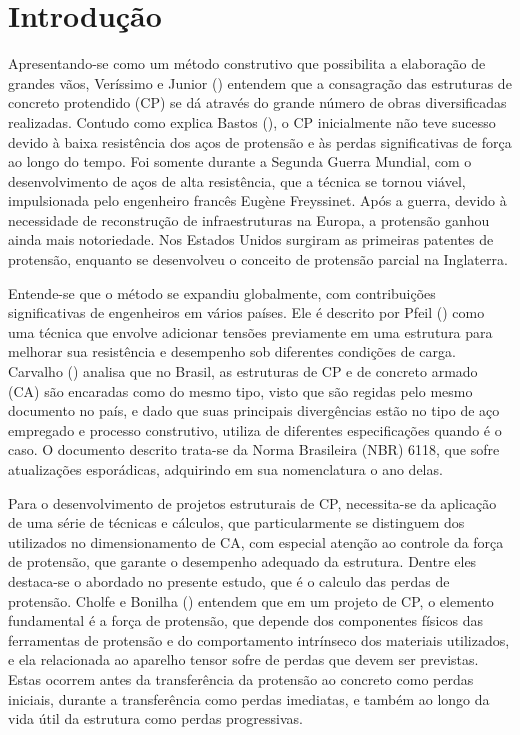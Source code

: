 \section{Introdução}

\hspace{0.4cm}Apresentando-se como um método construtivo que possibilita a elaboração de grandes vãos, Veríssimo e Junior (\citeyear{VER&JUN}) entendem que a consagração das estruturas de concreto protendido (CP) se dá através do grande número de obras diversificadas realizadas. Contudo como explica Bastos (\citeyear{BAS}), o CP inicialmente não teve sucesso devido à baixa resistência dos aços de protensão e às perdas significativas de força ao longo do tempo. Foi somente durante a Segunda Guerra Mundial, com o desenvolvimento de aços de alta resistência, que a técnica se tornou viável, impulsionada pelo engenheiro francês Eugène Freyssinet. Após a guerra, devido à necessidade de reconstrução de infraestruturas na Europa, a protensão ganhou ainda mais notoriedade. Nos Estados Unidos surgiram as primeiras patentes de protensão, enquanto se desenvolveu o conceito de protensão parcial na Inglaterra.

Entende-se que o método se expandiu globalmente, com contribuições significativas de engenheiros em vários países. Ele é descrito por Pfeil (\citeyear{PFEA}) como uma técnica que envolve adicionar tensões previamente em uma estrutura para melhorar sua resistência e desempenho sob diferentes condições de carga. Carvalho (\citeyear{CAR}) analisa que no Brasil, as estruturas de CP e de concreto armado (CA) são encaradas como do mesmo tipo, visto que são regidas pelo mesmo documento no país, e dado que suas principais divergências estão no tipo de aço empregado e processo construtivo, utiliza de diferentes especificações quando é o caso. O documento descrito trata-se da Norma Brasileira (NBR) 6118, que sofre atualizações esporádicas, adquirindo em sua nomenclatura o ano delas.

Para o desenvolvimento de projetos estruturais de CP, necessita-se da aplicação de uma série de técnicas e cálculos, que particularmente se distinguem dos utilizados no dimensionamento de CA, com especial atenção ao controle da força de protensão, que garante o desempenho adequado da estrutura. Dentre eles destaca-se o abordado no presente estudo, que é o calculo das perdas de protensão. Cholfe e Bonilha (\citeyear{CB}) entendem que em um projeto de CP, o elemento fundamental é a força de protensão, que depende dos componentes físicos das ferramentas de protensão e do comportamento intrínseco dos materiais utilizados, e ela relacionada ao aparelho tensor sofre de perdas que devem ser previstas. Estas ocorrem antes da transferência da protensão ao concreto como perdas iniciais, durante a transferência como perdas imediatas, e também ao longo da vida útil da estrutura como perdas progressivas.

